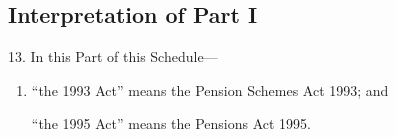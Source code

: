 \documentclass[12pt,a4paper]{article}
\begin{document}
%
%
%
%
%
%
%

\subsection*{Interpretation of Part I}

13. In this Part of this Schedule—
\begin{enumerate}\item[]
    “the 1993 Act” means the Pension Schemes Act 1993; and

    “the 1995 Act” means the Pensions Act 1995.  
\end{enumerate}
\end{document}
